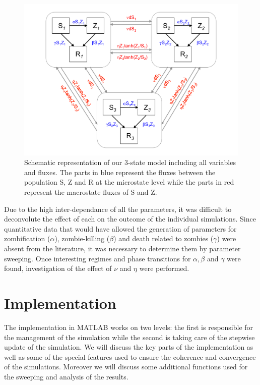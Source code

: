 \documentclass[11pt]{article} %
\begin{document}
\begin{figure}[h!]
\centerline{
\includegraphics[scale=0.45]{../images/Powerpoint_figures/total_model.pdf}}
\caption{Schematic representation of our 3-state model including all variables and fluxes. The parts in blue represent the fluxes between the population S, Z and R at the microstate level while the parts in red represent the macrostate fluxes of S and Z.\label{totalmodel} }
\end{figure}


Due to the high inter-dependance of all the parameters, it was difficult to deconvolute the effect of each on the outcome of the individual simulations. Since quantitative data that would have allowed the generation of parameters for zombification ($\alpha$), zombie-killing ($\beta$) and death related to zombies ($\gamma$) were absent from the literature, it was necessary to determine them by parameter sweeping. Once interesting regimes and phase transitions for $\alpha, \beta$ and $\gamma$ were found, investigation of the effect of $\nu$ and $\eta$ were performed.


\newpage
\section{Implementation}\indent

The implementation in MATLAB works on two levels: the first is responsible for the management of the simulation while the second is taking care of the stepwise update of the simulation. We will discuss the key parts of the implementation as well as some of the special features used to ensure the coherence and convergence of the simulations. Moreover we will discuss some additional functions used for the sweeping and analysis of the results.
\end{document}
